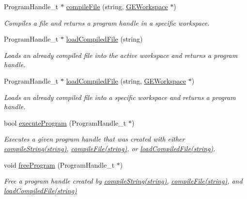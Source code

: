 \begin{DoxyCompactItemize}
Program\-Handle\-\_\-t $\ast$ \hyperlink{class_g_a_u_s_s_ab26d63e1aa776415ec71166705a98664}{compile\-File} (string, \hyperlink{class_g_e_workspace}{G\-E\-Workspace} $\ast$)
\begin{DoxyCompactList}\small\item\em Compiles a file and returns a program handle in a specific workspace. \end{DoxyCompactList}\item 
Program\-Handle\-\_\-t $\ast$ \hyperlink{class_g_a_u_s_s_ae05e76794c7c581efa1fb38e6a94652f}{load\-Compiled\-File} (string)
\begin{DoxyCompactList}\small\item\em Loads an already compiled file into the active workspace and returns a program handle. \end{DoxyCompactList}\item 
Program\-Handle\-\_\-t $\ast$ \hyperlink{class_g_a_u_s_s_a7609366538fd9b85e3fa85a4b9b7bdb7}{load\-Compiled\-File} (string, \hyperlink{class_g_e_workspace}{G\-E\-Workspace} $\ast$)
\begin{DoxyCompactList}\small\item\em Loads an already compiled file into a specific workspace and returns a program handle. \end{DoxyCompactList}\item 
bool \hyperlink{class_g_a_u_s_s_ad680244c55b1d32cba04ab95a6572862}{execute\-Program} (Program\-Handle\-\_\-t $\ast$)
\begin{DoxyCompactList}\small\item\em Executes a given program handle that was created with either \hyperlink{class_g_a_u_s_s_a5062f8fabacaba21e242785a6461f9d1}{compile\-String(string)}, \hyperlink{class_g_a_u_s_s_a182412bc30b9750b57de41d2334470de}{compile\-File(string)}, or \hyperlink{class_g_a_u_s_s_ae05e76794c7c581efa1fb38e6a94652f}{load\-Compiled\-File(string)}. \end{DoxyCompactList}\item 
void \hyperlink{class_g_a_u_s_s_a626ad1e9228347c6b0d56b2b41337586}{free\-Program} (Program\-Handle\-\_\-t $\ast$)
\begin{DoxyCompactList}\small\item\em Free a program handle created by \hyperlink{class_g_a_u_s_s_a5062f8fabacaba21e242785a6461f9d1}{compile\-String(string)}, \hyperlink{class_g_a_u_s_s_a182412bc30b9750b57de41d2334470de}{compile\-File(string)}, and \hyperlink{class_g_a_u_s_s_ae05e76794c7c581efa1fb38e6a94652f}{load\-Compiled\-File(string)} \end{DoxyCompactList}\item 

\end{DoxyCompactItemize}
